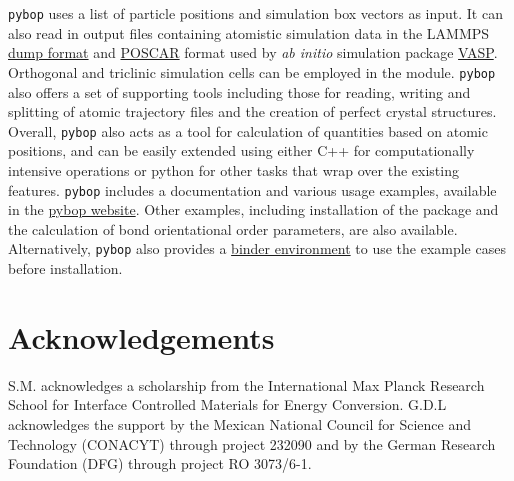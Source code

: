 \documentclass[]{article}
\begin{document}
\texttt{pybop} uses a list of particle positions and simulation box
vectors as input. It can also read in output files containing atomistic
simulation data in the LAMMPS \citep{Plimpton:1995}
\href{https://lammps.sandia.gov/doc/dump.html}{dump format} and
\href{https://cms.mpi.univie.ac.at/vasp/vasp/POSCAR_file.html}{POSCAR}
format used by \emph{ab initio} simulation package
\href{https://www.vasp.at/}{VASP}. Orthogonal and triclinic simulation
cells can be employed in the module. \texttt{pybop} also offers a set of
supporting tools including those for reading, writing and splitting of
atomic trajectory files and the creation of perfect crystal structures.
Overall, \texttt{pybop} also acts as a tool for calculation of
quantities based on atomic positions, and can be easily extended using
either C++ for computationally intensive operations or python for other
tasks that wrap over the existing features. \texttt{pybop} includes a
documentation and various usage examples, available in the
\href{https://pybop.readthedocs.io/en/latest/}{pybop website}. Other
examples, including installation of the package and the calculation of
bond orientational order parameters, are also available. Alternatively,
\texttt{pybop} also provides a
\href{https://mybinder.org/v2/gh/srmnitc/pybop/master?filepath=examples\%2F}{binder
environment} to use the example cases before installation.

\section{Acknowledgements}\label{acknowledgements}

S.M. acknowledges a scholarship from the International Max Planck
Research School for Interface Controlled Materials for Energy
Conversion. G.D.L acknowledges the support by the Mexican National
Council for Science and Technology (CONACYT) through project 232090 and
by the German Research Foundation (DFG) through project RO 3073/6-1.

\renewcommand\refname{References}

\end{document}
